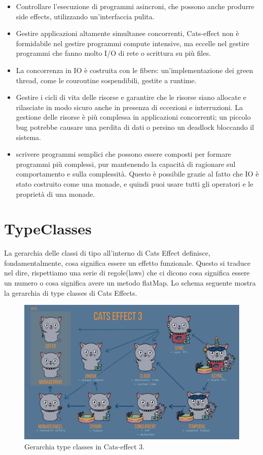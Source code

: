 \begin{itemize}
    \item Controllare l'esecuzione di programmi asincroni, che possono anche produrre side effects, utilizzando un’interfaccia pulita.
    \item Gestire applicazioni altamente simultanee concorrenti, Cats-effect non è formidabile nel gestire programmi compute intensive, ma eccelle nel gestire programmi che fanno molto I/O di rete o scrittura su più files.
    \item  La concorrenza in IO  è costruita con le fibers: un'implementazione dei green thread, come le couroutine sospendibili, gestite a runtime. 
    \item Gestire i cicli di vita delle risorse e garantire che le risorse siano allocate e rilasciate in modo sicuro anche in presenza di eccezioni e interruzioni. La gestione delle risorse è più complessa in applicazioni concorrenti; un piccolo bug potrebbe causare una perdita di dati o persino un deadlock bloccando il sistema.
    \item  scrivere programmi semplici che possono essere composti per formare programmi più complessi, pur mantenendo la capacità di ragionare sul comportamento e sulla complessità. Questo è possibile grazie al fatto che IO è stato costruito come una monade, e quindi puoi usare tutti gli operatori e le proprietà di una monade.
\end{itemize}


\section{TypeClasses}
La gerarchia delle classi di tipo all'interno di Cats Effect definisce, fondamentalmente, cosa significa essere un effetto funzionale. Questo si traduce nel dire, rispettiamo una serie di regole(laws) che ci dicono cosa significa essere un numero o cosa significa avere un metodo flatMap. Lo schema seguente mostra la gerarchia di type classes di Cats Effects.

\begin{figure}[H]
    \centering
    \includegraphics[scale=0.2]{img/hierarchy-impure.jpeg}
    \caption{Gerarchia type classes in Cats-effect 3.}
    \label{fig: Gerarchia type classes in Cats-effect 3}
\end{figure}

